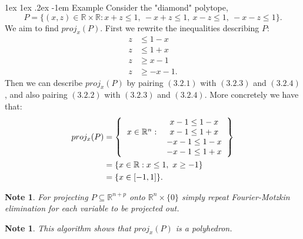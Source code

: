 \documentclass[11pt]{article}
\makeatletter
\renewcommand\paragraph{\@startsection{paragraph}{4}{0mm}%
                                    {1ex \@plus1ex \@minus.2ex}%
                                    {-1em}%
                                    {\normalfont\normalsize\bfseries}}
\newtheorem{note}[fact]{Note}
\newcommand{\R}{\ensuremath{\mathbb R}}
\makeatother
\begin{document}
\paragraph{Example}
Consider the "diamond" polytope, $$P = \{(x,z) \in \R \times \R:  x+z \leq 1,\ -x+z \leq 1,\ x-z \leq 1,\ -x-z \leq 1\}.$$
We aim to find $proj_x(P)$. First we rewrite the inequalities describing $P$:
\begin{align}
z &\leq 1 - x \\
z &\leq 1 + x \\
z &\geq x - 1 \\
z &\geq -x-1.
\end{align} 
Then we can describe $proj_x(P)$ by pairing $(3.2.1)$ with $(3.2.3)$ and $(3.2.4)$, and also pairing $(3.2.2)$ with $(3.2.3)$ and $(3.2.4)$. More concretely we have that:
\begin{align*}
proj_x(P) &=  \left \{ \begin{tabular}{ccc} &$x-1 \leq 1-x$ \\
$x \in \R^n : $&$x-1 \leq 1+x$ \\
&$-x-1 \leq 1-x$ \\
&$-x-1 \leq 1+x$
 \end{tabular} \right \}\\
&= \{x \in \R : x \leq 1,\ x \geq - 1\}\\
&= \{ x \in [-1,1]\}.
\end{align*}
\begin{note}
For projecting $P \subseteq \R^{n+p}$ onto $\R^n \times \{0\}$ simply repeat Fourier-Motzkin elimination for each variable to be projected out.
\end{note}
\begin{note}
This algorithm shows that $proj_x(P)$ is a polyhedron.
\end{note}
\end{document}
